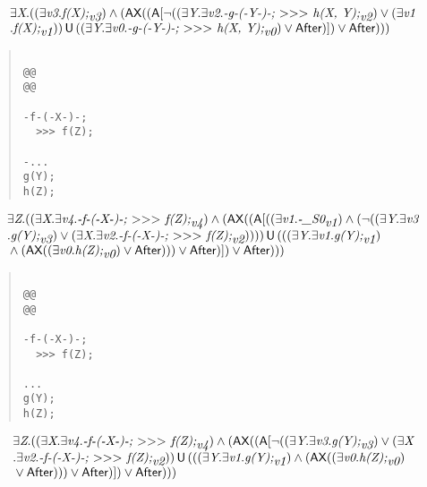 \documentclass{article}
\newcommand{\U}{\,\mbox{\sf{U}}\,}
\newcommand{\A}{\mbox{\sf{A}}}
\newcommand{\AX}{\mbox{\sf{AX}}}
\newcommand{\mita}[1]{\mbox{\it{{#1}}}}
\newcommand{\msf}[1]{\mbox{\sf{{#1}}}}
\newcommand{\mth}[1]{\({#1}\)}
\begin{document}
\[\begin{array}{l}
\exists \mita{X} . ((\exists \mita{v3} . \mita{f(X);}_{\mita{v3}}) \wedge (\AX((\A[\neg ((\exists \mita{Y} . \exists \mita{v2} . \mita{-g-(-Y-)-;
  \mth{>}\mth{>}\mth{>} h(X, Y);}_{\mita{v2}}) \vee (\exists \mita{v1}\\\mbox{} . \mita{f(X);}_{\mita{v1}})) \U ((\exists \mita{Y} . \exists \mita{v0} . \mita{-g-(-Y-)-;
  \mth{>}\mth{>}\mth{>} h(X, Y);}_{\mita{v0}}) \vee \msf{After})]
) \vee \msf{After})))
\end{array}\]

\begin{quote}\begin{verbatim}

@@
@@

-f-(-X-)-;
  >>> f(Z);

-...
g(Y);
h(Z);
\end{verbatim}\end{quote}

\[\begin{array}{l}
\exists \mita{Z} . ((\exists \mita{X} . \exists \mita{v4} . \mita{-f-(-X-)-;
  \mth{>}\mth{>}\mth{>} f(Z);}_{\mita{v4}}) \wedge (\AX((\A[((\exists \mita{v1} . \mita{-\_S0}_{\mita{v1}}) \wedge (\neg ((\exists \mita{Y} . \exists \mita{v3}\\\mbox{} . \mita{g(Y);}_{\mita{v3}}) \vee (\exists \mita{X} . \exists \mita{v2} . \mita{-f-(-X-)-;
  \mth{>}\mth{>}\mth{>} f(Z);}_{\mita{v2}})))) \U (((\exists \mita{Y} . \exists \mita{v1} . \mita{g(Y);}_{\mita{v1}})\\\mbox{} \wedge (\AX((\exists \mita{v0} . \mita{h(Z);}_{\mita{v0}}) \vee \msf{After}))) \vee \msf{After})]
) \vee \msf{After})))
\end{array}\]

\begin{quote}\begin{verbatim}

@@
@@

-f-(-X-)-;
  >>> f(Z);

...
g(Y);
h(Z);
\end{verbatim}\end{quote}

\[\begin{array}{l}
\exists \mita{Z} . ((\exists \mita{X} . \exists \mita{v4} . \mita{-f-(-X-)-;
  \mth{>}\mth{>}\mth{>} f(Z);}_{\mita{v4}}) \wedge (\AX((\A[\neg ((\exists \mita{Y} . \exists \mita{v3} . \mita{g(Y);}_{\mita{v3}}) \vee (\exists \mita{X}\\\mbox{} . \exists \mita{v2} . \mita{-f-(-X-)-;
  \mth{>}\mth{>}\mth{>} f(Z);}_{\mita{v2}})) \U (((\exists \mita{Y} . \exists \mita{v1} . \mita{g(Y);}_{\mita{v1}}) \wedge (\AX((\exists \mita{v0} . \mita{h(Z);}_{\mita{v0}})\\\mbox{} \vee \msf{After}))) \vee \msf{After})]
) \vee \msf{After})))
\end{array}\]
\end{document}
